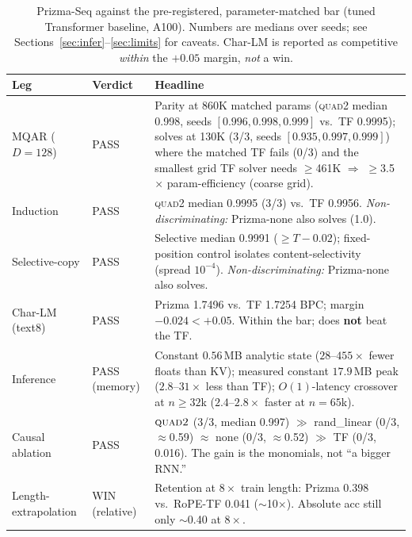 \documentclass[11pt]{article}
\newcommand{\quadtwo}{\textsc{quad2}}
\begin{document}
\begin{table}[t]
\centering
\small
\caption{Prizma-Seq against the pre-registered, parameter-matched bar (tuned Transformer baseline,
A100). Numbers are medians over seeds; see Sections~\ref{sec:infer}--\ref{sec:limits} for caveats.
Char-LM is reported as competitive \emph{within} the $+0.05$ margin, \emph{not} a win.}
\label{tab:bar}
\begin{tabular}{@{}llp{8.2cm}@{}}
\toprule
\textbf{Leg} & \textbf{Verdict} & \textbf{Headline} \\
\midrule
MQAR ($D{=}128$) & PASS &
Parity at 860K matched params (\quadtwo{} median 0.998, seeds $[0.996,0.998,0.999]$ vs.\ TF 0.9995);
solves at 130K (3/3, seeds $[0.935,0.997,0.999]$) where the matched TF fails (0/3) and the smallest
grid TF solver needs $\geq$461K $\Rightarrow$ $\geq$3.5$\times$ param-efficiency (coarse grid). \\
\addlinespace[2pt]
Induction & PASS &
\quadtwo{} median 0.9995 (3/3) vs.\ TF 0.9956. \emph{Non-discriminating:} Prizma-none also solves
(1.0). \\
\addlinespace[2pt]
Selective-copy & PASS &
Selective median 0.9991 ($\geq T{-}0.02$); fixed-position control isolates content-selectivity
(spread $10^{-4}$). \emph{Non-discriminating:} Prizma-none also solves. \\
\addlinespace[2pt]
Char-LM (text8) & PASS &
Prizma 1.7496 vs.\ TF 1.7254 BPC; margin $-0.024 < +0.05$. Within the bar; does \textbf{not} beat
the TF. \\
\addlinespace[2pt]
Inference & PASS (memory) &
Constant $0.56$\,MB analytic state ($28$--$455\times$ fewer floats than KV); measured constant
$17.9$\,MB peak ($2.8$--$31\times$ less than TF); $O(1)$-latency crossover at $n{\geq}32$k
($2.4$--$2.8\times$ faster at $n{=}65$k). \\
\addlinespace[2pt]
Causal ablation & PASS &
$\quadtwo$ (3/3, median 0.997) $\gg$ rand\_linear (0/3, $\approx$0.59) $\approx$ none (0/3,
$\approx$0.52) $\gg$ TF (0/3, 0.016). The gain is the monomials, not ``a bigger RNN.'' \\
\addlinespace[2pt]
Length-extrapolation & WIN (relative) &
Retention at $8\times$ train length: Prizma 0.398 vs.\ RoPE-TF 0.041 ($\sim$10$\times$). Absolute
acc still only $\sim$0.40 at $8\times$. \\
\bottomrule
\end{tabular}
\end{table}
\end{document}
